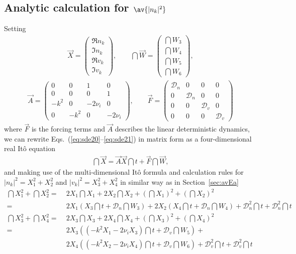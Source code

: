 \documentclass[10pt,a4paper]{article}
\newcommand{\eqs}[1]{Eqs.~(#1)}
\newcommand{\sect}[1]{Section~#1}
\newcommand{\src}{\ensuremath{\mathcal{D}}}
\begin{document}
\subsection{Analytic calculation for $\av{|n_k|^2}$}
Setting
\begin{align*}
\vec{X} = \left(\begin{array}{c}
\Re{n_{k}}\\\Im{n_{k}}\\\Re{v_{k}}\\\Im{v_{k}}
\end{array}\right),
\qquad
\dint{\vec{W}} = \left(\begin{array}{c}
\dint{W_3}\\\dint{W_4}\\\dint{W_5}\\\dint{W_6}
\end{array}\right),
\end{align*}
\begin{align*}
\vec{A} = \left(
\begin{array}{cccc}
0&0&1&0\\0&0&0&1\\{-}k^2&0&{-}2\nu_i&0\\0&{-}k^2&0&{-}2\nu_i
\end{array}\right),
\qquad
\vec{F} = \left(
\begin{array}{cccc}
\src_n&0&0&0\\0&\src_n&0&0\\0&0&\src_v&0\\0&0&0&\src_v
\end{array}\right)
\end{align*}
where $\vec{F}$ is the forcing terms and $\vec{A}$ describes the linear
deterministic dynamics, we can rewrite \eqs{\ref{eq:sde20}--\ref{eq:sde21}} in matrix form
as a four-dimensional real Itô equation 
\begin{align}
\dint{\vec{X}}= \vec{A} \vec{X}\dint{t}+ \vec{F} \dint{\vec{W}}, \label{eq:sdenmatrix}
\end{align}
and making use of the multi-dimensional Itô formula and calculation rules 
for $|n_k|^2=X_1^2+X_2^2$ and
$|v_k|^2=X_3^2+X_4^2$ in similar way as in \sect{\ref{sec:avEa}}
\begin{align*}
\dint{X_1^2}+\dint{X_2^2} = &\; 
2X_1\dint{X_1}+2X_2\dint{X_2}+(\dint{X_1})^2+(\dint{X_2})^2\\
= &\;
2X_1\left(X_3\dint{t}+\src_n\dint{W_3}\right)+
2X_2\left(X_4\dint{t}+\src_n\dint{W_4}\right)+
\src_n^2\dint{t}+\src_n^2\dint{t}\\
\dint{X_3^2}+\dint{X_4^2} = &\; 
2X_3\dint{X_3}+2X_4\dint{X_4}+(\dint{X_3})^2+(\dint{X_4})^2\\
= &\; 2X_3 \left(\left(-k^2X_1-2\nu_iX_3\right)\dint{t}+\src_v\dint{W_5}\right)+\\
  &\; 2X_4 \left(\left(-k^2X_2-2\nu_iX_4\right)\dint{t}+\src_v\dint{W_6}\right)+
\src_v^2\dint{t}+\src_v^2\dint{t}
\end{align*}
\end{document}
